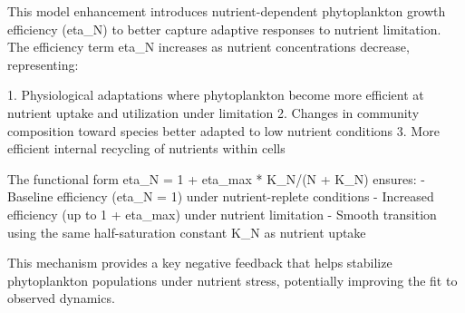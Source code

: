 This model enhancement introduces nutrient-dependent phytoplankton growth efficiency (eta_N) to better capture adaptive responses to nutrient limitation. The efficiency term eta_N increases as nutrient concentrations decrease, representing:

1. Physiological adaptations where phytoplankton become more efficient at nutrient uptake and utilization under limitation
2. Changes in community composition toward species better adapted to low nutrient conditions
3. More efficient internal recycling of nutrients within cells

The functional form eta_N = 1 + eta_max * K_N/(N + K_N) ensures:
- Baseline efficiency (eta_N = 1) under nutrient-replete conditions
- Increased efficiency (up to 1 + eta_max) under nutrient limitation
- Smooth transition using the same half-saturation constant K_N as nutrient uptake

This mechanism provides a key negative feedback that helps stabilize phytoplankton populations under nutrient stress, potentially improving the fit to observed dynamics.
